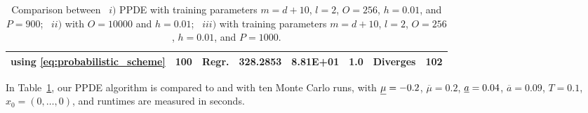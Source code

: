 \documentclass[12pt]{article}
\numberwithin{equation}{section}
\newcommand{\ubar}[1]{\smash{\underline {#1}}}
\let\oldcitet=\citet
\renewcommand{\cite}[1]{\textcolor[rgb]{0,0,1}{\oldcitet{#1}}}
\renewcommand{\citet}[1]{\textcolor[rgb]{0,0,1}{\oldcitet{#1}}}
\begin{document}
\begin{table}[H]
{\begin{tabular}{|c|c|c|c|c|c|c|c|}
            \cite{ren2017convergence} using \eqref{eq:probabilistic_scheme} & 100 & Regr. & 328.2853 & 8.81E+01 & 1.0 & Diverges & 102 \\
            \hline
		\end{tabular}}
		\caption{
            Comparison between
            \ $i)$ PPDE with training parameters
                $m = d+10$, $l  = 2$, $O = 256$, $h = 0.01$,
                and $P = 900$;
            \ $ii)$ \cite{ren2017convergence} with
                $O = 10000$ and $h = 0.01$;
            \ $iii)$ \cite{saporito2020pdgm} with training parameters
                $m = d+10$, $l  = 2$, $O = 256$, $h = 0.01$,
                and $P = 1000$.}
        \label{table:control_highdimension}
\end{table}
\noindent
 In Table~\ref{table:control_highdimension}, our PPDE algorithm is compared to
\cite{ren2017convergence} and \cite{saporito2020pdgm}
 with ten Monte Carlo runs,
 with $\ubar{\mu} = -0.2$, $\overline{\mu} = 0.2$, $\protect \ubar{a} = 0.04$, $\overline{a} = 0.09$, $T = 0.1$, $x_0 = (0, \ldots, 0)$,
 and runtimes are measured in seconds.

\end{document}

